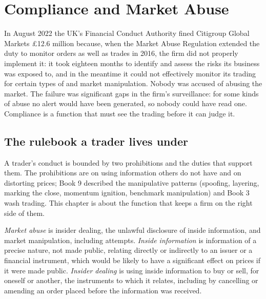 \chapter{Compliance and Market Abuse}\label{ch:fm:compliance-and-market-abuse}

In August 2022 the UK's Financial Conduct Authority fined Citigroup Global Markets \pounds12.6 million because, when the Market Abuse Regulation
extended the duty to monitor orders as well as trades in 2016, the firm did not properly implement it: it took eighteen months to identify and
assess the  risks its business was exposed to, and in the meantime it could not effectively monitor its trading for certain types of
 and market manipulation. Nobody was accused of abusing the market. The failure was significant gaps in the firm's surveillance: for some kinds of
abuse no alert would have been generated, so nobody could have read one. Compliance is a function that must see the trading before it can
judge it.

\section{The rulebook a trader lives under}

A trader's conduct is bounded by two prohibitions and the duties that support them. The prohibitions are on using information others do not have
and on distorting prices; Book 9 described the manipulative patterns (spoofing, layering, marking the close, momentum ignition, benchmark
manipulation) and Book 3 wash trading. This chapter is about the function that keeps a firm on the right side of them.

\begin{definition}\label{def:fm:compliance-and-market-abuse:abuse}
\emph{Market abuse} is insider dealing, the unlawful disclosure of inside information, and market manipulation, including
attempts. \emph{Inside information} is information of a precise nature, not made public, relating directly or indirectly
to an issuer or a financial instrument, which would be likely to have a significant effect on prices if it were made public. \emph{Insider
dealing} is using inside information to buy or sell, for oneself or another, the instruments to which it relates, including
by cancelling or amending an order placed before the information was received.
\end{definition}

